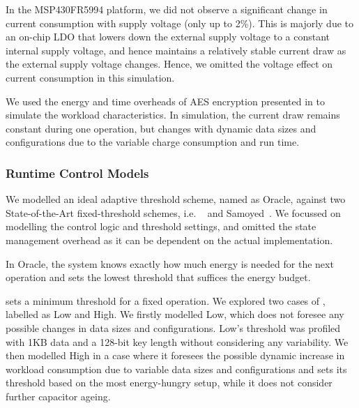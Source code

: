 

In the MSP430FR5994 platform, we did not observe a significant change in current consumption with supply voltage (only up to 2\%). 
This is majorly due to an on-chip LDO that lowers down the external supply voltage to a constant internal supply voltage, and hence maintains a relatively stable current draw as the external supply voltage changes. 
Hence, we omitted the voltage effect on current consumption in this simulation. 

We used the energy and time overheads of AES encryption presented in  to simulate the workload characteristics. 
In simulation, the current draw remains constant during one operation, but changes with dynamic data sizes and configurations due to the variable charge consumption and run time.

\subsubsection{Runtime Control Models}

We modelled an ideal adaptive threshold scheme, named as \nn{} Oracle, against two State-of-the-Art fixed-threshold schemes, i.e. \debs{}~\cite{gomez2016dynamic} and Samoyed~\cite{maeng2019supporting}.
We focussed on modelling the control logic and threshold settings, and omitted the state management overhead as it can be dependent on the actual implementation. 

In \nn{} Oracle, the system knows exactly how much energy is needed for the next operation and sets the lowest threshold that suffices the energy budget. 

\debs{} sets a minimum threshold for a fixed operation. 
We explored two cases of \debs{}, labelled as \debs{} Low and \debs{} High.
We firstly modelled \debs{} Low, which does not foresee any possible changes in data sizes and configurations. 
\debs{} Low's threshold was profiled with 1KB data and a 128-bit key length without considering any variability. 
We then modelled \debs{} High in a case where it foresees the possible dynamic increase in workload consumption due to variable data sizes and configurations and sets its threshold based on the most energy-hungry setup, while it does not consider further capacitor ageing.

